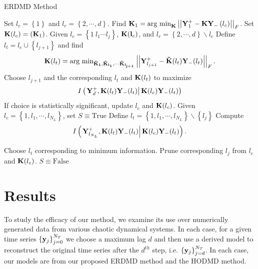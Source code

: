 \documentclass[a4paper,11pt]{article}
\newcommand{\gnorm}[1]{\left|\left|#1\right|\right|}
\begin{document}
\begin{algorithm}
\caption{ERDMD Method}
\begin{algorithmic}[1]
        \State Set $l_{c}=\left\{1\right\}$ and $l_{r}=\left\{2, \cdots, d\right\}$.
        \State Find ${\bf K}_{1} =  \text{arg min}_{\bf K}\gnorm{{\bf Y}^{+}_{1}-{\bf K}{\bf Y}_{-}\left(l_{c}\right)}_{F}$.  Set ${\bf K}(l_{c})=({\bf K}_{1})$.
    \EndProcedure
{}
        \State Given $l_{c}=\left\{1~l_{1} \cdots l_{j}\right\}$, ${\bf K}({\bf l}_{c})$, and $l_{r}=\left\{2,\cdots,d\right\}\backslash l_{c}$        
        \State Define $l_{t}=l_{c}\cup \left\{l_{j+1}\right\}$ and find
        \[
        {\bf K}(l_{t}) = \text{arg min}_{\bf \tilde{K}_{1}, {\bf \tilde{K}}_{l_{1}}, \cdots {\bf \tilde{K}}_{l_{j+1}}}\gnorm{{\bf Y}^{+}_{l_{j+1}}-{\bf \tilde{K}}(l_{t}){\bf Y}_{-}(l_{t}) }_{F}.
        \]          
    \EndFor
    \State Choose $l_{j+1}$ and the corresponding $l_{t}$ and ${\bf K}(l_{t})$ to maximize
        \[
        I\left(\left. {\bf Y}^{+}_{d}, {\bf K}(l_{t}){\bf Y}_{-}(l_{t})\right|{\bf K}(l_{c}){\bf Y}_{-}(l_{t})\right)
        \]
        \State If choice is statistically significant, update $l_{c}$ and ${\bf K}(l_{c})$.
    \EndWhile
    \EndProcedure
        \State Given $l_{c}=\left\{1,l_{1}, \cdots, l_{N_{L}}\right\}$, set $S \equiv \text{True}$
        	\State Define $l_{t}=\left\{1,l_{1}, \cdots, l_{N_{L}}\right\}\backslash \left\{l_{j}\right\}$
            \State Compute
            \[
            I\left(\left. {\bf Y}^{+}_{l_{N_{L}}}, {\bf K}(l_{t}){\bf Y}_{-}(l_{t})\right|{\bf K}(l_{c}){\bf Y}_{-}(l_{t})\right).
            \]
            
        \EndFor
        \State Choose $l_{t}$ corresponding to minimum information.  
        \State Prune corresponding $l_{j}$ from $l_{c}$ and ${\bf K}(l_{c})$.
        \Else
        \State $S\equiv \text{False}$
        \EndIf
        \EndWhile
    \EndProcedure
\end{algorithmic}
\label{erdmd}
\end{algorithm}

\section{Results}
To study the efficacy of our method, we examine its use over numerically generated data from various chaotic dynamical systems.  In each case, for a given time series $\left\{{\bf y}_{j}\right\}_{j=0}^{N_{T}}$ we choose a maximum lag $d$ and then use a derived model to reconstruct the original time series after the $d^{th}$ step, i.e. $\left\{{\bf y}_{j}\right\}_{j=d}^{N_{T}}$. In each case, our models are from our proposed ERDMD method and the HODMD method.   
\end{document}
